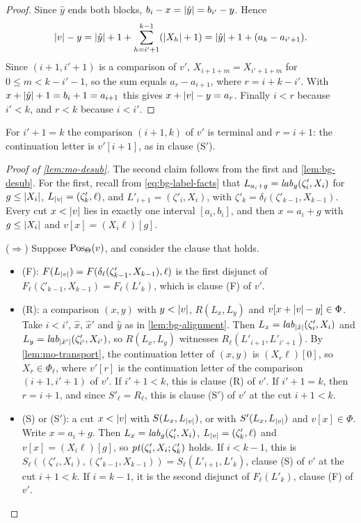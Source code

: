 \begin{proof}
Since $\hat y$ ends both blocks, $b_i-x=\lvert \hat y\rvert=b_{i'}-y$. Hence
\[
 \lvert v\rvert-y=\lvert \hat y\rvert+1+\sum_{h=i'+1}^{k-1}(\lvert X_h\rvert+1)
 =\lvert \hat y\rvert+1+(a_k-a_{i'+1}).
\]
Since $(i+1,i'+1)$ is a comparison of $v'$, $X_{i+1+m}=X_{i'+1+m}$ for
$0\le m<k-i'-1$, so the sum equals $a_r-a_{i+1}$, where $r=i+k-i'$. With
$x+\lvert \hat y\rvert+1=b_i+1=a_{i+1}$ this gives $x+\lvert v\rvert-y=a_r$. Finally $i<r$
because $i'<k$, and $r<k$ because $i<i'$.
\end{proof}

For $i'+1=k$ the comparison $(i+1,k)$ of $v'$ is terminal and $r=i+1$: the
continuation letter is $v'[i+1]$, as in clause (S$'$).

\begin{proof}[Proof of \cref{lem:mo-desub}]
The second claim follows from the first and \cref{lem:bg-desub}. For the first,
recall from \cref{eq:bg-label-facts} that $L_{a_i+g}=\mathit{lab}_g(\zeta'_i,X_i)$ for
$g\le\lvert X_i\rvert$, $L_{\lvert v\rvert}=(\zeta'_k,\ell)$, and $L'_{i+1}=(\zeta'_i,X_i)$,
with $\zeta'_k=\delta_\ell(\zeta'_{k-1},X_{k-1})$. Every cut $x<\lvert v\rvert$ lies in
exactly one interval $[a_i,b_i]$, and then $x=a_i+g$ with $g\le\lvert X_i\rvert$ and
$v[x]=(X_i\ell)[g]$.

($\Rightarrow$) Suppose $\operatorname{Pos}_\Theta(v)$, and consider the clause that holds.
\begin{itemize}[leftmargin=*]
\item (F): $F(L_{\lvert v\rvert})=F(\delta_\ell(\zeta'_{k-1},X_{k-1}),\ell)$ is the first
  disjunct of $F_\ell(\zeta'_{k-1},X_{k-1})=F_\ell(L'_k)$, which is clause (F)
  of $v'$.
\item (R): a comparison $(x,y)$ with $y<\lvert v\rvert$, $R(L_x,L_y)$ and
  $v[x+\lvert v\rvert-y]\in\Phi$. Take $i<i'$, $\hat x$, $\hat x'$ and $\hat y$ as in
  \cref{lem:bg-alignment}. Then $L_x=\mathit{lab}_{\lvert \hat x\rvert}(\zeta'_i,X_i)$ and
  $L_y=\mathit{lab}_{\lvert \hat x'\rvert}(\zeta'_{i'},X_{i'})$, so $R(L_x,L_y)$ witnesses
  $R_\ell(L'_{i+1},L'_{i'+1})$. By \cref{lem:mo-transport}, the continuation
  letter of $(x,y)$ is $(X_r\ell)[0]$, so $X_r\in\Phi_\ell$, where $v'[r]$ is
  the continuation letter of the comparison $(i+1,i'+1)$ of $v'$. If
  $i'+1<k$, this is clause (R) of $v'$. If $i'+1=k$, then $r=i+1$, and since
  $S'_\ell=R_\ell$, this is clause (S$'$) of $v'$ at the cut $i+1<k$.
\item (S) or (S$'$): a cut $x<\lvert v\rvert$ with $S(L_x,L_{\lvert v\rvert})$, or with
  $S'(L_x,L_{\lvert v\rvert})$ and $v[x]\in\Phi$. Write $x=a_i+g$. Then
  $L_x=\mathit{lab}_g(\zeta'_i,X_i)$, $L_{\lvert v\rvert}=(\zeta'_k,\ell)$ and
  $v[x]=(X_i\ell)[g]$, so $\mathit{pt}(\zeta'_i,X_i;\zeta'_k)$ holds. If $i<k-1$,
  this is $S_\ell((\zeta'_i,X_i),(\zeta'_{k-1},X_{k-1}))=S_\ell(L'_{i+1},L'_k)$,
  clause (S) of $v'$ at the cut $i+1<k$. If $i=k-1$, it is the second disjunct
  of $F_\ell(L'_k)$, clause (F) of $v'$.
\end{itemize}


\end{proof}
